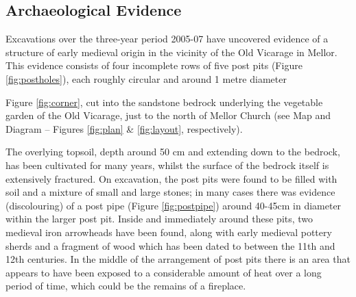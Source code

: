 \documentclass[letterpaper,11pt,titlepage]{article}
\begin{document}
\subsection{Archaeological Evidence}
Excavations over the three-year period 2005-07 have uncovered evidence of a structure of early medieval origin in the vicinity of the Old Vicarage in Mellor. This evidence consists of four incomplete rows of five post pits (Figure \ref{fig:postholes}), each roughly circular and around 1 metre diameter {Figure \ref{fig:corner}, cut into the sandstone bedrock underlying the vegetable garden of the Old Vicarage, just to the north of Mellor Church (see Map and Diagram -- Figures \ref{fig:plan} \& \ref{fig:layout}, respectively).

The overlying topsoil, depth around 50 cm and extending down to the bedrock, has been cultivated for many years, whilst the surface of the bedrock itself is extensively fractured. On excavation, the post pits were found to be filled with soil and a mixture of small and large stones; in many cases there was evidence (discolouring) of a post pipe (Figure \ref{fig:postpipe}) around 40-45cm in diameter within the larger post pit. Inside and immediately around these pits, two medieval iron arrowheads have been found, along with early medieval pottery sherds and a fragment of wood which has been dated to between the 11th and 12th centuries. In the middle of the arrangement of post pits there is an area that appears to have been exposed to a considerable amount of heat over a long period of time, which could be the remains of a fireplace.

}
\end{document}
